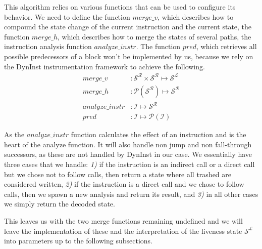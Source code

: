 This algorithm relies on various functions that can be used to configure its behavior. We need to define the 
function $merge\_v$, which describes how to compound the state change of the current instruction and the current state, 
the function $merge\_h$, which describes how to merge the states of several paths, the instruction analysis function
$analyze\_instr$. The function $pred$, which retrieves all possible predecessors of a block won't be implemented by us, 
because we rely on the DynInst instrumentation framework to achieve the following.
\begin{subequations}
\label{eq:livenesscustom}
\begin{align}
merge\_v &: \mathcal{S}^\mathcal{R} \times \mathcal{S}^\mathcal{R} \mapsto \mathcal{S}^\mathcal{L}\\
merge\_h &: \mathcal{P}(\mathcal{S}^\mathcal{R}) \mapsto \mathcal{S}^\mathcal{R}\\
analyze\_instr &: \mathcal {I} \mapsto \mathcal{S}^\mathcal{R} \\
pred &: \mathcal{I} \mapsto \mathcal{P}(\mathcal{I})
\end{align}
\end{subequations}

As the $analyze\_instr$ function calculates the effect of an instruction and is the heart of the analyze function. It will also 
handle non jump and non fall-through successors, as these are not handled by DynInst in our case. We essentially have three cases that we handle:
\textit{1)} if the instruction is an indirect call or a direct call but we chose not to follow calls, then return a state where all trashed 
are considered written,
\textit{2)}  if the instruction is a direct call and we chose to follow calls, then we spawn a new analysis and return its result, and
\textit{3)} in all other cases we simply return the decoded state.

This leaves us with the two merge functions remaining undefined and we will leave the implementation of these and the interpretation of 
the liveness state $\mathcal{S}^\mathcal{L}$ into parameters up to the following subsections.

%
%

